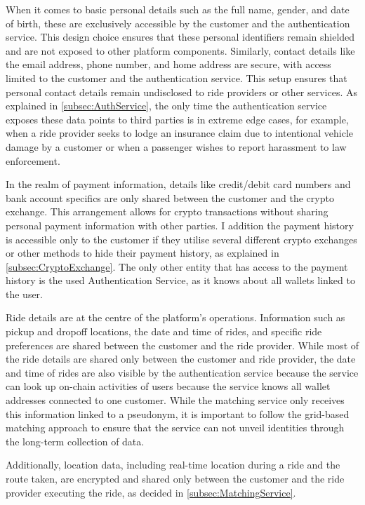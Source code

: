 When it comes to basic personal details such as the full name, gender, and date of birth, these are exclusively accessible by the customer and the authentication service. This design choice ensures that these personal identifiers remain shielded and are not exposed to other platform components. Similarly, contact details like the email address, phone number, and home address are secure, with access limited to the customer and the authentication service. This setup ensures that personal contact details remain undisclosed to ride providers or other services. As explained in \ref{subsec:AuthService}, the only time the authentication service exposes these data points to third parties is in extreme edge cases, for example, when a  ride provider seeks to lodge an insurance claim due to intentional vehicle damage by a customer or when a passenger wishes to report harassment to law enforcement.

In the realm of payment information, details like credit/debit card numbers and bank account specifics are only shared between the customer and the crypto exchange. This arrangement allows for crypto transactions without sharing personal payment information with other parties. I addition the payment history is accessible only to the customer if they utilise several different crypto exchanges or other methods to hide their payment history, as explained in \ref{subsec:CryptoExchange}. The only other entity that has access to the payment history is the used Authentication Service, as it knows about all wallets linked to the user.

Ride details are at the centre of the platform's operations. Information such as pickup and dropoff locations, the date and time of rides, and specific ride preferences are shared between the customer and the ride provider. While most of the ride details are shared only between the customer and ride provider, the date and time of rides are also visible by the authentication service because the service can look up on-chain activities of users because the service knows all wallet addresses connected to one customer. While the matching service only receives this information linked to a pseudonym, it is important to follow the grid-based matching approach to ensure that the service can not unveil identities through the long-term collection of data.

Additionally, location data, including real-time location during a ride and the route taken, are encrypted and shared only between the customer and the ride provider executing the ride, as decided in \ref{subsec:MatchingService}. 

